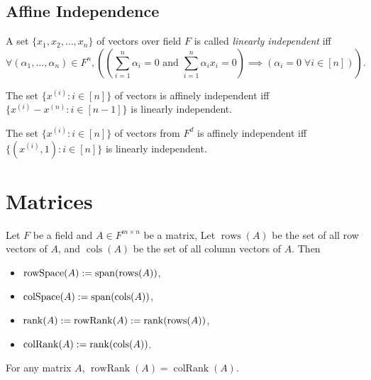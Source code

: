 \documentclass[a4paper,12pt,fleqn]{article}
\newenvironment*{tightemize}{\begin{itemize}[noitemsep]}{\end{itemize}}
\DeclareMathOperator{\Span}{span}
\DeclareMathOperator{\rank}{rank}
\DeclareMathOperator{\rows}{rows}
\DeclareMathOperator{\cols}{cols}
\begin{document}
\subsection{Affine Independence}

\begin{definition}
A set $\{x_1, x_2, \ldots, x_n\}$ of vectors over field $F$
is called \emph{linearly independent} iff
\[ \forall (\alpha_1, \ldots, \alpha_n) \in F^n,
\left( \left(\sum_{i=1}^n \alpha_i = 0 \textrm{ and } \sum_{i=1}^n \alpha_i x_i = 0 \right)
    \implies (\alpha_i = 0 \;\forall i \in [n])\right). \]
\end{definition}

\begin{theorem}
The set $\{x^{(i)}: i \in [n]\}$ of vectors is affinely independent iff
$\{x^{(i)} - x^{(n)}: i \in [n-1]\}$ is linearly independent.
\end{theorem}

\begin{theorem}
The set $\{x^{(i)}: i \in [n]\}$ of vectors from $F^d$ is affinely independent iff
$\{(x^{(i)}, 1): i \in [n]\}$ is linearly independent.
\end{theorem}

\section{Matrices}

\begin{definition}
Let $F$ be a field and $A \in F^{m \times n}$ be a matrix,
Let $\rows(A)$ be the set of all row vectors of $A$,
and $\cols(A)$ be the set of all column vectors of $A$. Then
\begin{tightemize}
\item $\operatorname{rowSpace}(A) \defeq \Span(\rows(A))$,
\item $\operatorname{colSpace}(A) \defeq \Span(\cols(A))$,
\item $\rank(A) \defeq \operatorname{rowRank}(A) \defeq \rank(\rows(A))$,
\item $\operatorname{colRank}(A) \defeq \rank(\cols(A))$.
\end{tightemize}
\end{definition}

\begin{theorem}[DWAP]
For any matrix $A$, $\operatorname{rowRank}(A) = \operatorname{colRank}(A)$.
\end{theorem}
\end{document}
